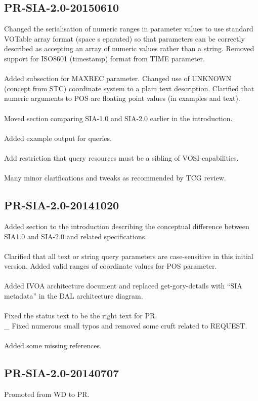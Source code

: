 \documentclass[11pt,a4paper]{ivoa}
\begin{document}
\subsection{PR-SIA-2.0-20150610}
Changed the serialisation of numeric ranges in parameter values to use standard VOTable array format (space s eparated) so that parameters can be correctly described as accepting an array of numeric values rather than a string. Removed support for ISO8601 (timestamp) format from TIME parameter. \\ \\
Added subsection for MAXREC parameter. Changed use of UNKNOWN (concept from STC) coordinate system to a plain text description. Clarified that numeric arguments to POS are floating point values (in examples and text). \\ \\
Moved section comparing SIA-1.0 and SIA-2.0 earlier in the introduction. \\ \\ 
Added example output for queries. \\ \\
Add restriction that {query} resources must be a sibling of VOSI-capabilities. \\ \\
Many minor clarifications and tweaks as recommended by TCG review.
\subsection{PR-SIA-2.0-20141020}
Added section to the introduction describing the conceptual difference between SIA1.0 and SIA-2.0 and related specifications. \\ \\
Clarified that all text or string {query} parameters are case-sensitive in this initial version. Added valid ranges of coordinate values for POS parameter. \\ \\
Added IVOA architecture document and replaced get-gory-details with “SIA metadata” in the DAL architecture diagram. \\ \\
Fixed the status text to be the right text for PR. \\ \_
Fixed numerous small typos and removed some cruft related to REQUEST. \\ \\
Added some missing references.
\subsection{PR-SIA-2.0-20140707}
Promoted from WD to PR.
\end{document}
